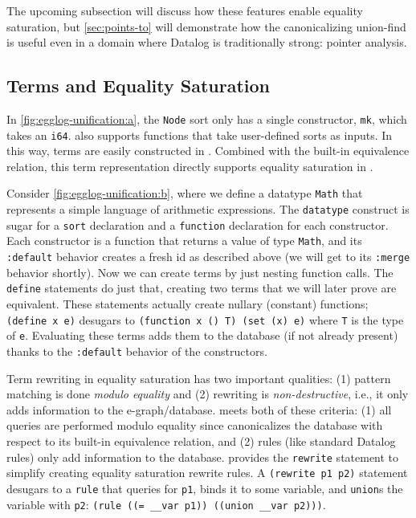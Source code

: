 The upcoming subsection will discuss how these features enable
 equality saturation,
 but \autoref{sec:points-to} will demonstrate how
 the canonicalizing union-find is useful even in a domain
 where Datalog is traditionally strong: pointer analysis.

\subsection{Terms and Equality Saturation}\label{sec:eqsat}


In \autoref{fig:egglog-unification:a},
 the \lstinline{Node} sort only has a single constructor, 
 \lstinline{mk}, which takes an \lstinline{i64}.
\egglog also supports functions that take user-defined sorts as inputs.
In this way, terms are easily constructed in \egglog.
Combined with the built-in equivalence relation,
 this term representation directly supports equality saturation in \egglog.

Consider \autoref{fig:egglog-unification:b},
 where we define a datatype \lstinline{Math} 
 that represents a simple language of arithmetic expressions.
The \lstinline{datatype} construct is sugar for
 a \lstinline{sort} declaration
 and a \lstinline{function} declaration for each constructor.
Each constructor is a function that returns a value of type \lstinline{Math},
 and its \lstinline{:default} behavior creates a fresh id
 as described above
 (we will get to its \lstinline{:merge} behavior shortly).
Now we can create terms by just nesting function calls.
The \lstinline{define} statements do just that, 
 creating two terms that we will later prove are equivalent.
These statements actually create nullary (constant) functions;
 \lstinline{(define x e)} desugars to
 \lstinline{(function x () T) (set (x) e)} 
 where \lstinline{T} is the type of \lstinline{e}.
Evaluating these terms
 adds them to the database (if not already present)
 thanks to the \lstinline{:default} behavior of the constructors.

Term rewriting in equality saturation
 has two important qualities:
 (1) pattern matching is done \emph{modulo equality} and
 (2) rewriting is \emph{non-destructive}, i.e., 
     it only adds information to the e-graph/database.
\Egglog meets both of these criteria:
 (1) all queries are performed modulo equality since
     \egglog canonicalizes the database with respect 
     to its built-in equivalence relation,
     and
 (2) \egglog rules (like standard Datalog rules) only add information
     to the database.
\Egglog provides the 
 \lstinline{rewrite} statement
 to simplify creating
 equality saturation rewrite rules.
A \lstinline{(rewrite p1 p2)} statement
 desugars to a \lstinline{rule} that queries
 for \lstinline{p1}, binds it to some variable,
 and \lstinline{union}s the variable with \lstinline{p2}:
 \lstinline{(rule ((= __var p1)) ((union __var p2)))}.

